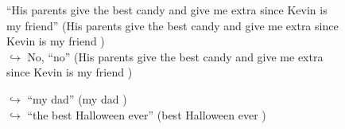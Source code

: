 \documentclass[11pt,a4paper, onecolumn]{article}
\begin{document}
\begin{figure}[t]
\begin{tcolorbox}[boxsep=0pt,left=5pt,right=0pt,top=2pt,colback = yellow!5]
\begin{dialogue}
{ ``His parents give the best candy and give me extra since Kevin is my friend'' (His parents give the best candy and give me extra since Kevin is my friend ) }
\\
\colorbox{pink!25}{$\hookrightarrow$}
\colorbox{red!25}{No,}
{ ``no'' (His parents give the best candy and give me extra since Kevin is my friend ) }
\\
 \end{dialogue}\end{tcolorbox}\end{figure}\begin{figure}[t] \small \begin{tcolorbox}[boxsep=0pt,left=5pt,right=0pt,top=2pt,colback = yellow!5] \begin{dialogue}
 \small 
\colorbox{pink!25}{$\hookrightarrow$}
{ ``my dad'' (my dad ) }
\\
\colorbox{pink!25}{$\hookrightarrow$}
{ ``the best Halloween ever'' (best Halloween ever ) }
\\
 \end{dialogue}\end{tcolorbox}\end{figure}
\end{document}
